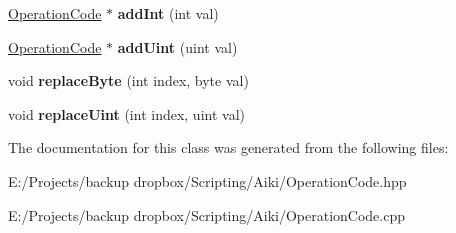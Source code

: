 \begin{DoxyCompactItemize}
\item 
\hypertarget{a00015_a2eef4417f202cef42b6ff21ae7c13681}{\hyperlink{a00015}{Operation\+Code} $\ast$ {\bfseries add\+Int} (int val)}\label{a00015_a2eef4417f202cef42b6ff21ae7c13681}

\item 
\hypertarget{a00015_a12f4b8427569261595a535d6815d64ce}{\hyperlink{a00015}{Operation\+Code} $\ast$ {\bfseries add\+Uint} (uint val)}\label{a00015_a12f4b8427569261595a535d6815d64ce}

\item 
\hypertarget{a00015_a19153b35fd9800909a27ea787f0e791f}{void {\bfseries replace\+Byte} (int index, byte val)}\label{a00015_a19153b35fd9800909a27ea787f0e791f}

\item 
\hypertarget{a00015_a81ac6d741fefd5decbba3cd6a1f37cc2}{void {\bfseries replace\+Uint} (int index, uint val)}\label{a00015_a81ac6d741fefd5decbba3cd6a1f37cc2}

\end{DoxyCompactItemize}


The documentation for this class was generated from the following files\+:\begin{DoxyCompactItemize}
\item 
E\+:/\+Projects/backup dropbox/\+Scripting/\+Aiki/Operation\+Code.\+hpp\item 
E\+:/\+Projects/backup dropbox/\+Scripting/\+Aiki/Operation\+Code.\+cpp\end{DoxyCompactItemize}
